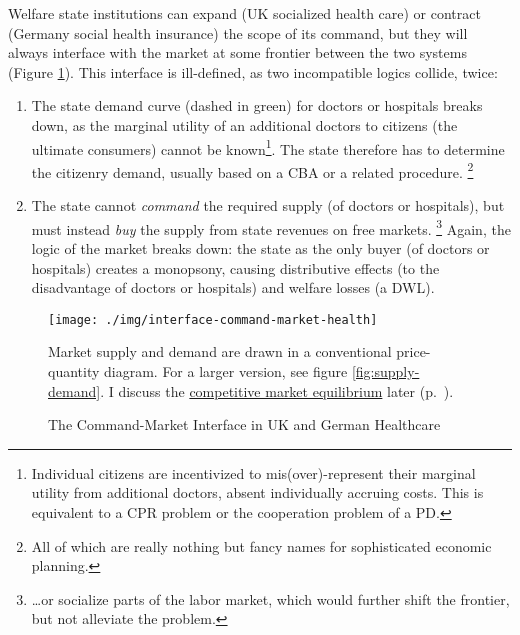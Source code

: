 Welfare state institutions can expand (UK socialized health care) or contract (Germany social health insurance) the scope of its command, but they will always interface with the market at some frontier between the two systems (Figure \ref{fig:interface-command-market-health}).
This interface is ill-defined, as two incompatible logics collide, twice:
\begin{enumerate}
	\item The state demand curve (dashed in green) for doctors or hospitals breaks down, as the marginal utility of an additional doctors to citizens (the ultimate consumers) cannot be known\footnote
		{Individual citizens are incentivized to mis(over)-represent their marginal utility from additional doctors, absent individually accruing costs.
		This is equivalent to a \gls{CPR} problem or the cooperation problem of a \gls{PD}.}.
	The state therefore has to determine the citizenry demand, usually based on a \gls{CBA} or a related procedure.
	\footnote{
		All of which are really nothing but fancy names for sophisticated economic planning.
	}
	\item The state cannot \emph{command} the required supply (of doctors or hospitals), but must instead \emph{buy} the supply from state revenues on free markets.
	\footnote{
		\ldots or socialize parts of the labor market, which would further shift the frontier, but not alleviate the problem.
	}
	Again, the logic of the market breaks down: the state as the only buyer (of doctors or hospitals) creates a monopsony, causing distributive effects (to the disadvantage of doctors or hospitals) and welfare losses (a \gls{DWL}).
\end{enumerate}

\begin{landscape}
 \begin{figure}[htbp]
	\begin{center}
	\texttt{[image: ./img/interface-command-market-health]}
	\caption[Command-Market Interface in UK and German Healthcare]{The Command-Market Interface in UK and German Healthcare}
	\label{fig:interface-command-market-health}
	\end{center}
	\scriptsize{Market supply and demand are drawn in a conventional price-quantity diagram.
	For a larger version, see figure \ref{fig:supply-demand}.
	I discuss the \hyperref[sec:market-solutions-production]{competitive market equilibrium} later (p.~\pageref{sec:market-solutions-production}).}
\end{figure}
\end{landscape}

